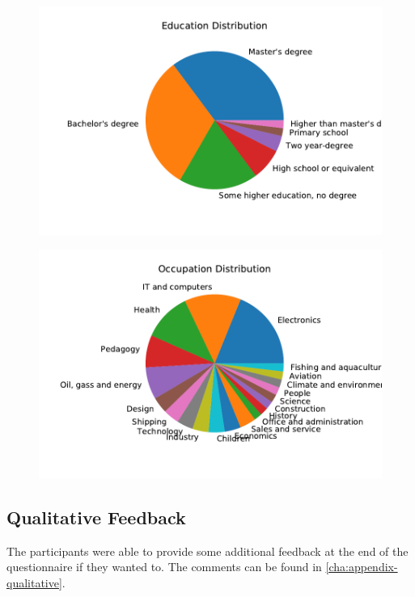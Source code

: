 \begin{figure}
\centering
\begin{minipage}{.5\textwidth}
  \centering
  \includegraphics[width=\linewidth]{img/subjective_measures/demographic/education.pdf}
  \label{fig:education}
\end{minipage}%
\begin{minipage}{.5\textwidth}
  \centering
  \includegraphics[width=\linewidth]{img/subjective_measures/demographic/occupations.pdf}
  \label{fig:occupation}
\end{minipage}
\end{figure}




\subsection{Qualitative Feedback}
The participants were able to provide some additional feedback at the end of the questionnaire if they wanted to. The comments can be found in \autoref{cha:appendix-qualitative}.
